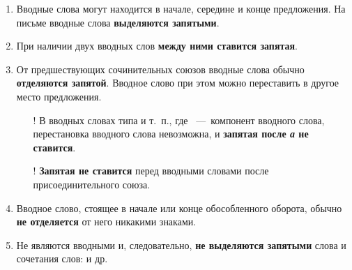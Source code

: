 \documentclass[main]{subfile}
\begin{document}
\begin{enumerate}
      \item Вводные слова могут находится в начале, середине и конце предложения. На письме вводные слова \textbf{выделяются запятыми}. \newline
      \item При наличии двух вводных слов \textbf{между ними ставится запятая}. \newline
      \item От предшествующих сочинительных союзов вводные слова обычно \textbf{отделяются запятой}. Вводное слово при этом можно переставить в другое место предложения. \newline

            \begin{itemize}
                  \item[!] В вводных словах типа  и т. п., где  --- компонент вводного слова, перестановка вводного слова невозможна, и \textbf{запятая после \textit{а} не ставится}. \newline
                  \item[!] \textbf{Запятая не ставится} перед вводными словами после присоединительного союза. \newline
            \end{itemize}

      \item Вводное слово, стоящее в начале или конце обособленного оборота, обычно \textbf{не отделяется} от него никакими знаками. \newline
      \item Не являются вводными и, следовательно, \textbf{не выделяются запятыми} слова и сочетания слов:  и др. \newline
\end{enumerate}
\end{document}
